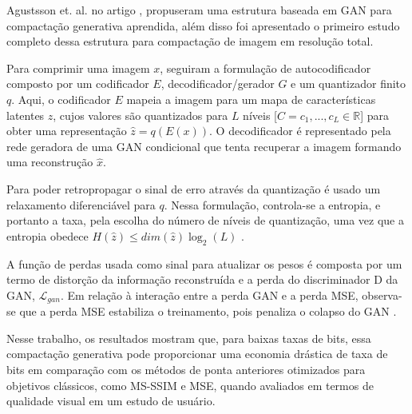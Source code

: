 Agustsson et. al. no artigo \cite{agustsson2019generative}, propuseram uma estrutura baseada em GAN para compactação generativa aprendida, além disso foi apresentado o primeiro estudo completo dessa estrutura para compactação de imagem em resolução total. 

Para comprimir uma imagem $x$, seguiram a formulação de autocodificador composto por um codificador $E$, decodificador/gerador $G$  e um quantizador finito $q$. 
Aqui, o codificador $E$ mapeia a imagem para um mapa de características latentes $z$, cujos valores são quantizados para $L$ níveis [$C = {c_1,. . . , c_L}  \in \mathbb{R}$]  para obter uma representação $\hat{z} = q(E(x))$.
O decodificador é representado pela rede geradora de uma GAN condicional \cite{mirza2014conditional}  que tenta recuperar a imagem formando uma reconstrução $\hat{x}$.

Para poder retropropagar o sinal de erro através da quantização é usado um relaxamento diferenciável para $q$. Nessa formulação, controla-se a entropia, e portanto a taxa, pela escolha do número de níveis de quantização, uma vez que a entropia obedece  $H(\hat{z}) \leq dim(\hat{z}) \log_2(L)$  \cite{agustsson2019generative}. 

A função de perdas usada como sinal para atualizar os pesos é composta por um termo de distorção da informação reconstruída e a perda do discriminador D da GAN, $\mathcal{L}_{gan}$. Em relação à interação entre a perda GAN e a perda MSE, observa-se que a perda MSE estabiliza o treinamento, pois penaliza o colapso do GAN  \cite{agustsson2019generative}.

Nesse trabalho, os resultados mostram que, para baixas taxas de bits, essa compactação generativa pode proporcionar uma economia drástica de taxa de bits em comparação com os métodos de ponta anteriores otimizados para objetivos clássicos, como MS-SSIM e MSE, quando avaliados em termos de qualidade visual em um estudo de usuário. 
